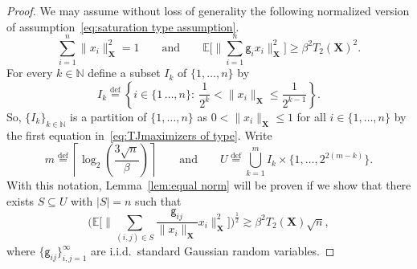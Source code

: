 \documentclass[11pt,reqno]{amsart}
\renewcommand{\le}{\leqslant}
\renewcommand{\ge}{\geqslant}
\newcommand{\n}{\{1,\ldots,n\}}
\newcommand{\X}{\mathbf X}
\theoremstyle{remark}
\renewcommand{\subset}{\subseteq}
\newcommand{\E}{\mathbb{ E}}
\newcommand{\N}{\mathbb N}
\newcommand{\eqdef}{\stackrel{\mathrm{def}}{=}}
\renewcommand{\1}{\mathbf 1}
\newcommand{\g}{\mathsf{g}}
\begin{document}
\begin{proof} We may assume without loss of generality the following normalized version of assumption~\eqref{eq:saturation type assumption}.
\begin{equation}\label{eq:TJmaximizers of type}
\sum_{i=1}^n \|x_i\|_\X^2=1\qquad\mathrm{and}\qquad \E\bigg[\Big\|\sum_{i=1}^n \g_i x_i\Big\|_\X^2\bigg]\ge \beta^2 T_2(\X)^2.
\end{equation}
For every $k\in \N$ define a subset $I_k$ of $\n$ by
\begin{equation}\label{eq:def Ik}
I_k\eqdef \left\{i\in \{1\,\dots,n\}:\ \frac{1}{2^k}<\|x_i\|_{\X}\le \frac{1}{2^{k-1}}\right\}.
\end{equation}
So, $\{I_k\}_{k\in \N}$ is a partition of $\{1,\ldots,n\}$ as $0<\|x_i\|_{\X}\le 1$ for all $i\in \n$ by the first equation in~\eqref{eq:TJmaximizers of type}. Write
\begin{equation}\label{eq:def mU}
m\eqdef \left\lceil\log_2\left(\frac{3\sqrt{n}}{\beta}\right)\right\rceil\qquad \mathrm{and}\qquad
U\eqdef \bigcup_{k=1}^m I_k\times \Big\{1,\ldots, 2^{2(m-k)}\Big\}.
\end{equation}
With this notation,  Lemma~\ref{lem:equal norm} will be proven if we  show that there exists  $S\subset U$ with $|S|=n$ such that
\begin{equation}\label{eq:goal equal norm}
\Bigg(\E\bigg[\Big\|\sum_{(i,j)\in S} \frac{\g_{ij}}{\|x_i\|_\X}x_i\Big\|_\X^2\bigg]\Bigg)^{\frac12}\gtrsim \beta^2T_2(\X)\sqrt{n},
\end{equation}
where  $\{\g_{ij}\}_{i,j=1}^\infty$  are i.i.d.~standard Gaussian random variables.



\end{proof}
\end{document}
